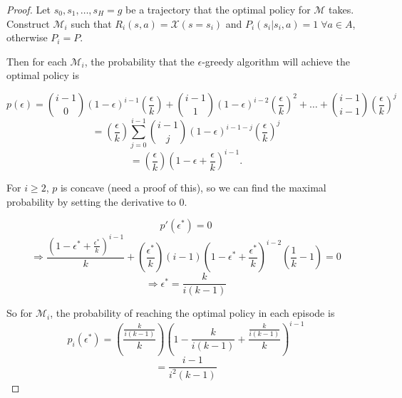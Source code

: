 \documentclass[12pt, letterpaper]{article}
\theoremstyle{definition}
\theoremstyle{remark}
\begin{document}
\begin{proof}[Proof]
    Let \(s_0, s_1, \ldots, s_H = g\) be a trajectory that the optimal policy for \(\mathcal{M}\) takes.
    Construct \(\mathcal{M}_i\) such that \(R_i(s, a) = \mathcal{X}(s = s_i)\) and \(P_i(s_i | s_i, a) = 1 \; \forall a \in A\), otherwise \(P_i = P\).

    Then for each \(\mathcal{M}_i\), the probability that the \(\epsilon\)-greedy algorithm will achieve the optimal policy is

    \[p(\epsilon) = {i-1 \choose 0} (1-\epsilon)^{i-1}(\frac{\epsilon}{k}) + {i-1 \choose 1}(1-\epsilon)^{i-2}(\frac{\epsilon}{k})^2 + \ldots + {i-1 \choose i-1} (\frac{\epsilon}{k})^j\]
    \[= (\frac{\epsilon}{k})\sum_{j=0}^{i-1}{i-1 \choose j} (1-\epsilon)^{i-1-j}(\frac{\epsilon}{k})^{j}\]
    \[= (\frac{\epsilon}{k})(1-\epsilon + \frac{\epsilon}{k})^{i-1}.\]

    For \(i \geq 2\), \(p\) is concave (need a proof of this), so we can find the maximal probability by setting the derivative to 0.

    \[p'(\epsilon^*) = 0\]
    \[\Rightarrow \frac{(1-\epsilon^* + \frac{\epsilon^*}{k})^{i-1}}{k} + (\frac{\epsilon^*}{k})(i-1)(1 - \epsilon^* + \frac{\epsilon^*}{k})^{i-2}(\frac{1}{k}-1) = 0\]
    \[\Rightarrow \epsilon^* = \frac{k}{i(k-1)}\]

    So for \(\mathcal{M}_i\), the probability of reaching the optimal policy in each episode is
    \[p_i(\epsilon^*) = (\frac{\frac{k}{i(k-1)}}{k})(1 - \frac{k}{i(k-1)} + \frac{\frac{k}{i(k-1)}}{k})^{i-1}\]
    \[= \frac{i-1}{i^2(k-1)}\]

    


\end{proof}
\end{document}
